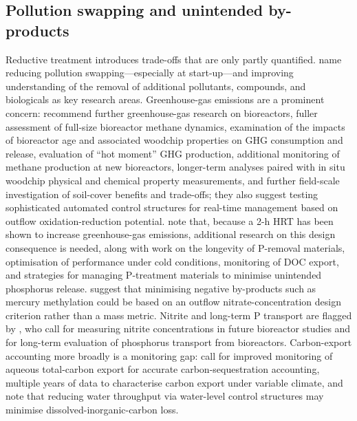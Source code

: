 \documentclass[11pt]{article}
\begin{document}
\subsection{Pollution swapping and unintended by-products}
Reductive treatment introduces trade-offs that are only partly quantified. \textcite{Christianson2021} name reducing pollution swapping---especially at start-up---and improving understanding of the removal of additional pollutants, compounds, and biologicals as key research areas. Greenhouse-gas emissions are a prominent concern: \textcite{Brunton2024} recommend further greenhouse-gas research on bioreactors, fuller assessment of full-size bioreactor methane dynamics, examination of the impacts of bioreactor age and associated woodchip properties on GHG consumption and release, evaluation of ``hot moment'' GHG production, additional monitoring of methane production at new bioreactors, longer-term analyses paired with in situ woodchip physical and chemical property measurements, and further field-scale investigation of soil-cover benefits and trade-offs; they also suggest testing sophisticated automated control structures for real-time management based on outflow oxidation-reduction potential. \textcite{Strock2025} note that, because a 2-h HRT has been shown to increase greenhouse-gas emissions, additional research on this design consequence is needed, along with work on the longevity of P-removal materials, optimisation of performance under cold conditions, monitoring of DOC export, and strategies for managing P-treatment materials to minimise unintended phosphorus release. \textcite{Maxwell2022} suggest that minimising negative by-products such as mercury methylation could be based on an outflow nitrate-concentration design criterion rather than a mass metric. Nitrite and long-term P transport are flagged by \textcite{Bell2015}, who call for measuring nitrite concentrations in future bioreactor studies and for long-term evaluation of phosphorus transport from bioreactors. Carbon-export accounting more broadly is a monitoring gap: \textcite{Schilling2023} call for improved monitoring of aqueous total-carbon export for accurate carbon-sequestration accounting, multiple years of data to characterise carbon export under variable climate, and note that reducing water throughput via water-level control structures may minimise dissolved-inorganic-carbon loss.
\end{document}
